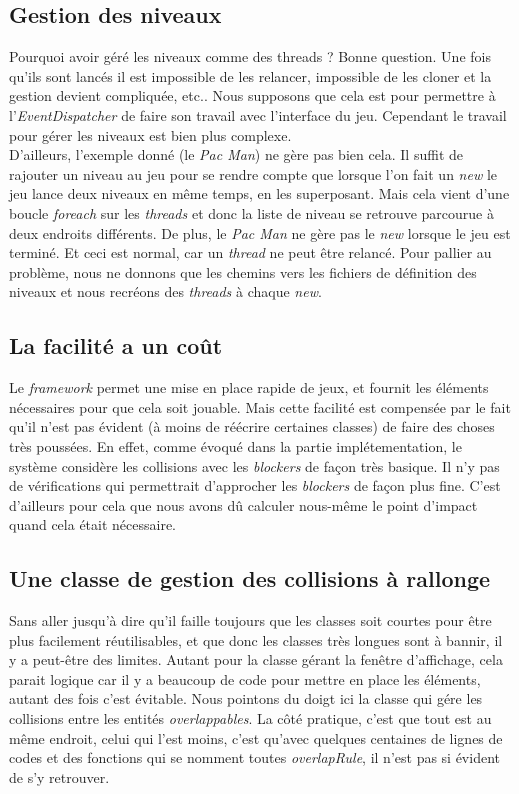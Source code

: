 \documentclass[a4paper,10pt]{article}
\begin{document}
    \subsection{Gestion des niveaux}
        Pourquoi avoir géré les niveaux comme des threads ? Bonne question. Une fois qu'ils sont lancés il est impossible de les
        relancer, impossible de les cloner et la gestion devient compliquée, etc.. Nous supposons que cela est pour permettre
        à l'\textit{EventDispatcher} de faire son travail avec l'interface du jeu. Cependant le travail pour gérer
        les niveaux est bien plus complexe. \\
        D'ailleurs, l'exemple donné (le \textit{Pac Man}) ne gère pas bien cela. Il suffit de rajouter un niveau au jeu
        pour se rendre compte que lorsque l'on fait un \textit{new} le jeu lance
        deux niveaux en même temps, en les superposant. Mais cela vient d'une boucle \textit{foreach} sur les \textit{threads} et donc
        la liste de niveau se retrouve parcourue à deux endroits différents. De plus, le \textit{Pac Man} ne gère
        pas le \textit{new} lorsque le jeu est terminé. Et ceci est normal, car un \textit{thread} ne peut être
        relancé. Pour pallier au problème, nous ne donnons que les chemins vers les fichiers de définition des
        niveaux et nous recréons des \textit{threads} à chaque \textit{new}.

    \subsection{La facilité a un coût}
        Le \textit{framework} permet une mise en place rapide de jeux, et fournit les éléments nécessaires pour
        que cela soit jouable. Mais cette facilité est compensée par le fait qu'il n'est pas évident (à moins
        de réécrire certaines classes) de faire des choses très poussées. En effet, comme évoqué dans la partie
        implétementation, le système considère les collisions avec les \textit{blockers} de façon très basique.
        Il n'y pas de vérifications qui permettrait d'approcher les \textit{blockers} de façon plus
        fine. C'est d'ailleurs pour cela que nous avons dû calculer nous-même le point d'impact quand cela
        était nécessaire.

    \subsection{Une classe de gestion des collisions à rallonge}
        Sans aller jusqu'à dire qu'il faille toujours que les classes soit courtes pour être plus facilement
        réutilisables, et que donc les classes très longues sont à bannir, il y a peut-être
        des limites.
        Autant pour la classe gérant la fenêtre d'affichage, cela parait logique car il y a beaucoup
        de code pour mettre en place les éléments, autant des fois c'est évitable. Nous pointons du doigt ici la classe
        qui gére les collisions entre les entités \textit{overlappables}. La côté pratique, c'est que tout est au
        même endroit, celui qui l'est moins, c'est qu'avec quelques centaines de lignes de codes et des fonctions
        qui se nomment toutes \textit{overlapRule}, il n'est pas si évident de s'y retrouver.
\end{document}
